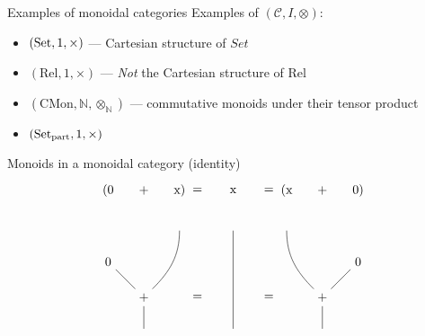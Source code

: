 \documentclass[fleqn]{beamer}
\newcommand\Rel{\mathrm{Rel}}
\begin{document}
\begin{frame}{Examples of monoidal categories}
  Examples of $(\mathcal C, I, \otimes)$:
  \begin{itemize}
    \item $(\operatorname{Set}, 1, \times)$ --- Cartesian structure of $Set$
    \item $(\Rel, 1, \times)$ --- \emph{Not} the Cartesian structure of $\Rel$
    \item $(\mathrm{CMon}, \mathbb N, \otimes_{\mathbb N})$ ---
      commutative monoids under their tensor product
    \item $(\operatorname{Set}_{\mathrm{part}}, 1, \times)$
  \end{itemize}
\end{frame}

\begin{frame}{Monoids in a monoidal category (identity)}
  \[
    \begin{tikzpicture}[baseline]
      \path
      (-3.5,1) node(0l) {0}
      (-1.5,2) node(xl) {}
      (-2.5,0) node(+l) {+}
      (-2.5,-1) node(resl) {}
      ;
      \path
      (-3.5,3) node {(0}
      (-2.5,3) node {+}
      (-1.5,3) node {x)}
      ;

      \draw (0l) -- (+l);
      \draw (xl) to[out=270,in=45] (+l);
      \draw (+l) -- (resl);

      \node at (-1,0) {=};
      \node at (-1,3) {=};

      \path
      (0,2) node(x) {}
      (0,-1) node(res) {}
      ;
      \path
      (0,3) node {x}
      ;

      \draw (x) -- (res);

      \node at (1,0) {=};
      \node at (1,3) {=};

      \path
      (3.5,1) node(0) {0}
      (1.5,2) node(x) {}
      (2.5,0) node(+) {+}
      (2.5,-1) node(res) {}
      ;
      \path
      (3.5,3) node {0)}
      (2.5,3) node {+}
      (1.5,3) node {(x}
      ;

      \draw (0) -- (+);
      \draw (x) to[out=270,in=135] (+);
      \draw (+) -- (res);
    \end{tikzpicture}
  \]
\end{frame}
\end{document}
